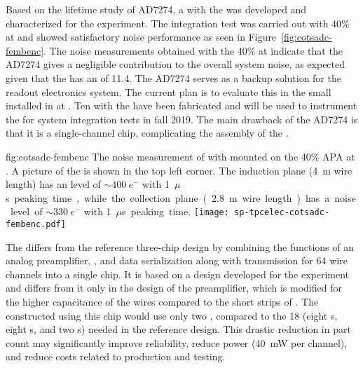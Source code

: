 Based on the lifetime study of AD7274, a  with the  
 was developed and characterized for the  experiment. The 
integration test was carried out with 40\%  at  and 
showed satisfactory noise performance as seen in Figure~\ref{fig:cotsadc-fembenc}.
The noise measurements obtained with the  40\%  at  indicate
that the AD7274 gives a negligible contribution to the overall system noise, as
expected given that the  has an 
of \num{11.4}. The   AD7274 serves as a backup solution for the 
   readout electronics system. The current 
plan is to evaluate this  in the small  installed in
 at . Ten  with the  
 have been fabricated and will be used to instrument the  
 for system integration tests in fall 2019. The main drawback of
the AD7274  is that it is a single-channel chip, complicating the 
assembly of the .

\begin{dunefigure}
{fig:cotsadc-fembenc}
{The noise measurement of  with   
mounted on the \num{40}\% APA at . A picture of the 
 is shown in the top left corner. The induction plane 
(\SI{4}{m} wire length) has an  level of $\sim\SI{400}{e^-}$ with \SI{1}{$\mu$s} 
peaking time, while the collection plane (\SI{2.8}{m} wire length) has a noise level
of $\sim\SI{330}{e^-}$ with \SI{1}{$\mu$s} peaking time.}
\texttt{[image: sp-tpcelec-cotsadc-fembenc.pdf]}
\end{dunefigure}

\label{sec:fdsp-tpcelec-design-femb-alt-cryo}


The    differs from the reference three-chip 
design by combining the functions of an analog preamplifier, , and 
data serialization along with transmission for \num{64} wire channels into a single 
chip. It is based on a design developed for the  experiment~\cite{nEXO} 
and differs from it only in the design of the preamplifier, which is modified for 
the higher capacitance of the   wires compared to the short
strips of . The  constructed using this chip would use only 
two , compared to the \num{18} (eight s, eight s, and 
two s) needed in the reference design. This drastic reduction in 
part count may significantly improve  reliability, reduce power 
(\SI{40}{mW} per channel), and reduce costs related to production and testing.


